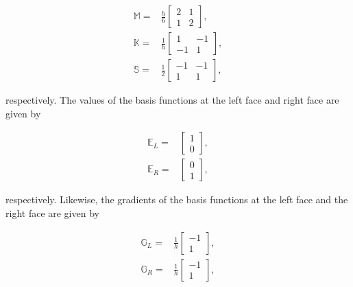 \begin{equation}
\label{eq::App_DSA_MIP_1D_cell_matrices}
\begin{aligned}
	\mathbb{M} =& \frac{h}{6}
	\left[ \begin{array}{cc}
	2 & 1 \\
	1 & 2 
	\end{array} \right] ,\\
	\mathbb{K} =& \frac{1}{h}
	\left[ \begin{array}{cc}
	1 & -1 \\
	-1 & 1 
	\end{array} \right] ,\\
	\mathbb{S} =& \frac{1}{2}
	\left[ \begin{array}{cc}
	-1 & -1 \\
	 1 & 1 
	\end{array} \right] ,
\end{aligned}
\end{equation}

\noindent respectively. The values of the basis functions at the left face and right face are given by

\begin{equation}
\label{eq::App_DSA_MIP_1D_facemass_matrices}
\begin{aligned}
	\mathbb{E}_L =& 
	\left[ \begin{array}{c}
	1  \\
	0 
	\end{array} \right] ,\\
	\mathbb{E}_R =& 
	\left[ \begin{array}{c}
	0  \\
	1
	\end{array} \right] ,
\end{aligned}
\end{equation}

\noindent respectively. Likewise, the gradients of the basis functions at the left face and the right face are given by

\begin{equation}
\label{eq::App_DSA_MIP_1D_facegrad_matrices}
\begin{aligned}
	\mathbb{G}_L =& \frac{1}{h}
	\left[ \begin{array}{c}
	-1  \\
	1 
	\end{array} \right] ,\\
	\mathbb{G}_R =& \frac{1}{h}
	\left[ \begin{array}{c}
	-1  \\
	1
	\end{array} \right] ,
\end{aligned}
\end{equation}

